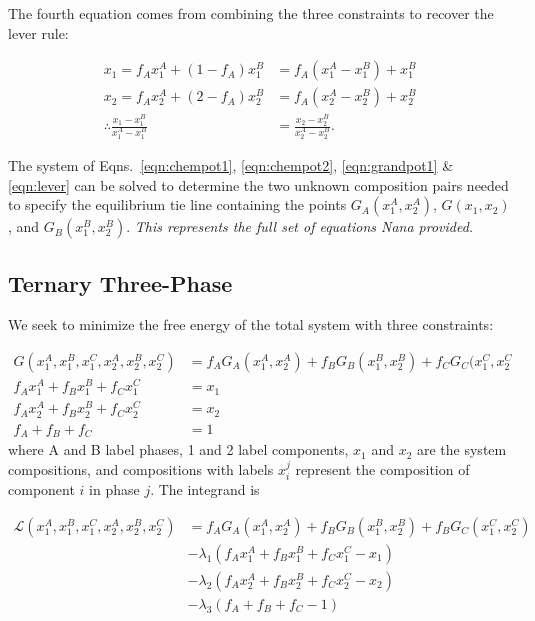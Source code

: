 \documentclass[10pt]{article}
\begin{document}
The fourth equation comes from combining the three constraints to recover the lever rule:

\begin{align}
  x_1 = f_A x_1^A + (1 - f_A) x_1^B &= f_A(x_1^A - x_1^B) + x_1^B\\
  x_2 = f_A x_2^A + (2 - f_A) x_2^B &= f_A(x_2^A - x_2^B) + x_2^B\\
  \label{eqn:lever}
  \therefore \frac{x_1 - x_1^B}{x_1^A - x_1^B} &= \frac{x_2 - x_2^B}{x_2^A - x_2^B}.
\end{align}

The system of Eqns.~\ref{eqn:chempot1}, \ref{eqn:chempot2}, \ref{eqn:grandpot1}
\& \ref{eqn:lever} can be solved to determine the two unknown composition pairs
needed to specify the equilibrium tie line containing the points
$G_A(x_1^A,x_2^A)$, $G(x_1,x_2)$, and $G_B(x_1^B,x_2^B)$. \emph{This represents
  the full set of equations Nana provided.}

\newpage
\subsection*{Ternary Three-Phase}

We seek to minimize the free energy of the total system with three constraints:

\begin{align}
  G(x_1^A, x_1^B, x_1^C, x_2^A, x_2^B, x_2^C) &= f_A G_A(x_1^A,x_2^A) + f_B G_B(x_1^B, x_2^B) + f_C G_C(x_1^C, x_2^C\\
  f_A x_1^A + f_B x_1^B + f_C x_1^C &= x_1\\
  f_A x_2^A + f_B x_2^B + f_C x_2^C &= x_2\\
  f_A + f_B + f_C &= 1
\end{align}
where A and B label phases, 1 and 2 label components, $x_1$ and $x_2$ are the system compositions,
and compositions with labels $x_i^j$ represent the composition of component $i$ in phase $j$.
The integrand is

\begin{align}
  \nonumber
  \mathcal{L}(x_1^A, x_1^B, x_1^C, x_2^A, x_2^B, x_2^C)
                         &= f_A G_A(x_1^A, x_2^A) + f_B G_B(x_1^B, x_2^B) + f_B G_C(x_1^C, x_2^C)\\
  \nonumber
                         &- \lambda_1(f_A x_1^A + f_B x_1^B + f_C x_1^C - x_1)\\
  \nonumber
                         &- \lambda_2(f_A x_2^A + f_B x_2^B + f_C x_2^C - x_2)\\
                         &- \lambda_3(f_A + f_B + f_C - 1)
\end{align}
\end{document}
